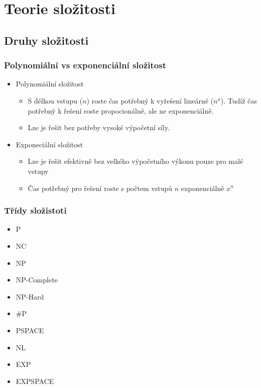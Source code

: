 \section{Teorie složitosti}
\subsection{Druhy složitosti}

\subsubsection{Polynomiální vs exponenciální složitost}
\begin{itemize}
    \item Polynomiální složitost
    \begin{itemize}
        \item S délkou vstupu (\(n\)) roste čas potřebný k vyřešení lineárně (\(n^x\)). Tudíž čas potřebný k řešení roste propocionálně, ale ne exponenciálně.
        \item Lze je řešit bez potřeby vysoké výpočetní síly.
    \end{itemize}
    \item Exponeciální složitost
    \begin{itemize}
        \item Lze je řešit efektivně bez velkého výpočetního výkonu pouze pro malé vstupy
        \item Čas potřebný pro řešení roste s počtem vstupů \(n\) exponenciálně \(x^n\)
    \end{itemize}
\end{itemize}

\subsubsection{Třídy složistoti}
\begin{itemize}
    \item P
    \item NC
    \item NP
    \item NP-Complete 
    \item NP-Hard
    \item \#P
    \item PSPACE
    \item NL
    \item EXP
    \item EXPSPACE
\end{itemize}

